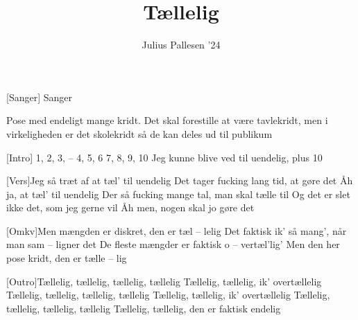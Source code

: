 \documentclass[a4paper,11pt]{article}
\title{Tællelig}
\author{Julius Pallesen '24}
\begin{document}
\maketitle

\begin{roles}
[Sanger] Sanger
\end{roles}

\begin{props}
     Pose med endeligt mange kridt. Det skal forestille at være tavlekridt, men i virkeligheden er det skolekridt så de kan deles ud til publikum
\end{props}

\begin{song}

[Intro] 1, 2, 3, – 4, 5, 6
7, 8, 9, 10
Jeg kunne blive ved
til uendelig, plus 10

[Vers]Jeg så træt af at tæl' til uendelig
Det tager fucking lang tid, at gøre det
Åh ja, at tæl' til uendelig
Der så fucking mange tal, man skal tælle til
Og det er slet ikke det, som jeg gerne vil
Åh men, nogen skal jo gøre det

[Omkv]Men mængden er diskret, den er tæl – lelig
Det faktisk ik' så mang', når man sam – ligner det
De fleste mængder er faktisk o – vertæl'lig'
Men den her pose kridt, den er tælle – lig


[Outro]Tællelig, tællelig, tællelig, tællelig 
Tællelig, tællelig, ik' overtællelig
Tællelig, tællelig, tællelig, tællelig
Tællelig, tællelig, ik' overtællelig
Tællelig, tællelig, tællelig, tællelig
Tællelig, tællelig, den er faktisk endelig 

\end{song}
\end{document}
